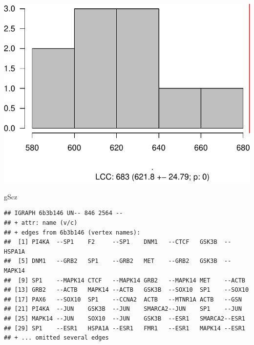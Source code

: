\documentclass[
]{book}
\newenvironment{Shaded}{\begin{snugshade}}{\end{snugshade}}
\newcommand{\NormalTok}[1]{#1}
\begin{document}
\includegraphics{NetMed_files/figure-latex/unnamed-chunk-23-1.pdf}

\begin{Shaded}
\begin{Highlighting}[]
\NormalTok{gScz }
\end{Highlighting}
\end{Shaded}

\begin{verbatim}
## IGRAPH 6b3b146 UN-- 846 2564 -- 
## + attr: name (v/c)
## + edges from 6b3b146 (vertex names):
##  [1] PI4KA  --SP1    F2     --SP1    DNM1   --CTCF   GSK3B  --HSPA1A
##  [5] DNM1   --GRB2   SP1    --GRB2   MET    --GRB2   GSK3B  --MAPK14
##  [9] SP1    --MAPK14 CTCF   --MAPK14 GRB2   --MAPK14 MET    --ACTB  
## [13] GRB2   --ACTB   MAPK14 --ACTB   GSK3B  --SOX10  SP1    --SOX10 
## [17] PAX6   --SOX10  SP1    --CCNA2  ACTB   --MTNR1A ACTB   --GSN   
## [21] PI4KA  --JUN    GSK3B  --JUN    SMARCA2--JUN    SP1    --JUN   
## [25] MAPK14 --JUN    SOX10  --JUN    GSK3B  --ESR1   SMARCA2--ESR1  
## [29] SP1    --ESR1   HSPA1A --ESR1   FMR1   --ESR1   MAPK14 --ESR1  
## + ... omitted several edges
\end{verbatim}
\end{document}
